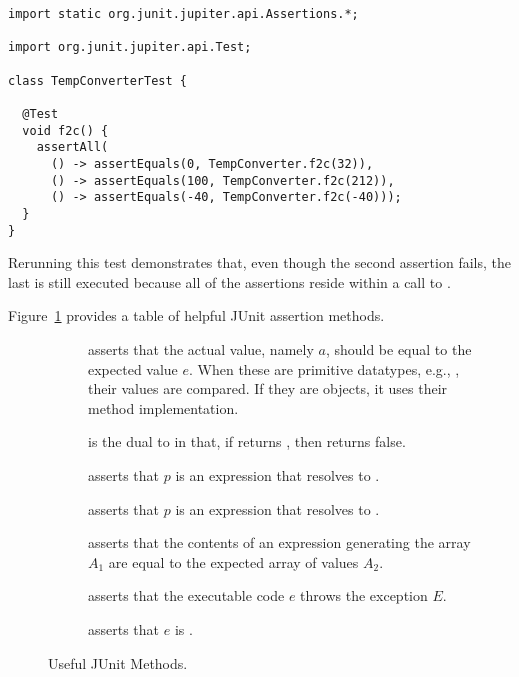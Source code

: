 \begin{lstlisting}[language=MyJava]
import static org.junit.jupiter.api.Assertions.*;

import org.junit.jupiter.api.Test;
  
class TempConverterTest {

  @Test
  void f2c() {
    assertAll(
      () -> assertEquals(0, TempConverter.f2c(32)),
      () -> assertEquals(100, TempConverter.f2c(212)),
      () -> assertEquals(-40, TempConverter.f2c(-40)));
  }
}
\end{lstlisting}
Rerunning this test demonstrates that, even though the second assertion fails, the last is still executed because all of the assertions reside within a call to . 

Figure~\ref{fig:testingmethods} provides a table of helpful JUnit assertion methods.

\begin{figure}[tp]
    \small
    \begin{tcolorbox}[title=JUnit 5 Testing Methods]
    \begin{description}
      \item [] asserts that the actual value, namely $a$, should be equal to the expected value $e$. When these are primitive datatypes, e.g., , their values are compared. If they are objects, it uses their  method implementation.
      \item [] is the dual to  in that, if  returns , then  returns false.
      \item [] asserts that $p$ is an expression that resolves to .
      \item [] asserts that $p$ is an expression that resolves to .
      \item [] asserts that the contents of an expression generating the array $A_1$ are equal to the expected array of values $A_2$. 
      \item [] asserts that the executable code $e$ throws the exception $E$.
      \item [] asserts that $e$ is .
    \end{description}
  \end{tcolorbox}
    \caption{Useful JUnit Methods.}
    \label{fig:testingmethods}
  \end{figure}
